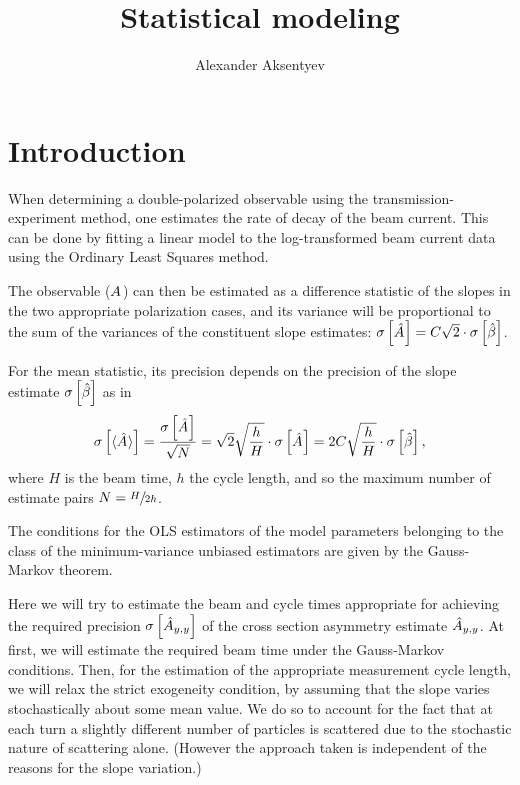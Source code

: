 \documentclass{article}
\begin{document}
\title{Statistical modeling}
\author{Alexander Aksentyev}
\maketitle

\section*{Introduction}
When determining a double-polarized observable using the transmission-experiment method, one estimates the rate of decay of the beam current. This can be done by fitting a linear model to the log-transformed beam current data using the Ordinary Least Squares method.

The observable ($\A$) can then be estimated as a difference statistic of the slopes in the two appropriate polarization cases, and its variance will be proportional to the sum of the variances of the constituent slope estimates: $\SE{\A*} = C\sqrt{2}\cdot\SE{\slp*}$.

For the mean statistic, its precision depends on the precision of the slope estimate $\SE{\slp*}$ as in
\begin{equation}\label{eq:AvgASE}
	\SE{\avg{\A*}} = \frac{\SE{\A*}}{\sqrt N} = \sqrt{2}\sqrt{\frac hH}\cdot\SE{\A*} = 2C\sqrt{\frac hH}\cdot\SE{\slp*},
\end{equation}
where $H$ is the beam time, $h$ the cycle length, and so the maximum number of estimate pairs $N = \sfrac{H}{2h}$.

The conditions for the OLS estimators of the model parameters belonging to the class of the minimum-variance unbiased estimators are given by the Gauss-Markov theorem. 

Here we will try to estimate the beam and cycle times appropriate for achieving the required precision $\SE{\Ayy*}$ of the cross section asymmetry estimate $\Ayy*$. At first, we will estimate the required beam time under the Gauss-Markov conditions. Then, for the estimation of the appropriate measurement cycle length, we will relax the strict exogeneity condition, by assuming that the slope varies stochastically about some mean value. We do so to account for the fact that at each turn a slightly different number of particles is scattered due to the stochastic nature of scattering alone. (However the approach taken is independent of the reasons for the slope variation.)
\end{document}

